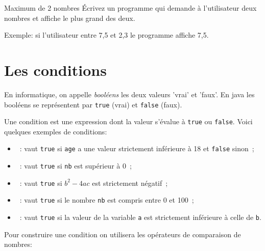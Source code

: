 \documentclass[a4paper,11pt]{style-esi/td}
\begin{document}
\newpage

\begin{Exercice}{Maximum de 2 nombres}
	\'Ecrivez un programme qui demande à l'utilisateur deux nombres
	et affiche le plus grand des deux.

	Exemple: si l'utilisateur entre 7,5 et 2,3 le programme affiche 7,5.
\end{Exercice}

\section{Les conditions}

En informatique, on appelle \emph{booléens} les deux valeurs 'vrai' et 'faux'.
En java les booléens se représentent par \texttt{true} (vrai) et \texttt{false}
(faux).

Une condition est une expression dont la valeur s'évalue à \texttt{true} ou
\texttt{false}.
Voici quelques exemples de conditions:

\begin{itemize}
	\item {}~:  vaut \texttt{true} si \texttt{age} a une valeur
	      strictement inférieure à 18 et \texttt{false} sinon~;
	\item {}~:  vaut \texttt{true} si \texttt{nb} est supérieur à
	      0~;
	\item {}~: vaut \texttt{true} si $b^2-4ac$ est
	      strictement négatif~;
	\item {}~: vaut \texttt{true} si le nombre
	      \texttt{nb} est compris entre 0 et 100~;
	\item {}~:  vaut \texttt{true} si la valeur de la variable
	      \texttt{a} est strictement inférieure à celle de \texttt{b}.
\end{itemize}


Pour construire une condition on utilisera les opérateurs de comparaison de nombres:
\end{document}
